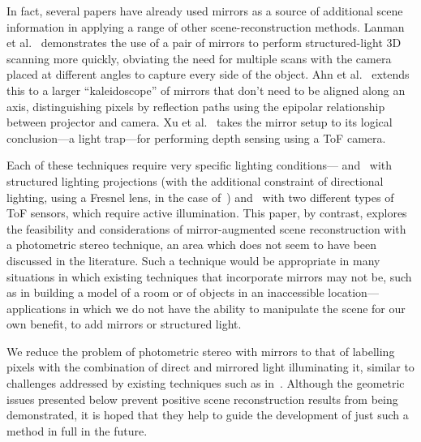 In fact, several papers have already used mirrors as a source of additional
scene information in applying a range of other scene-reconstruction methods.
Lanman et al.~\cite{lanman} demonstrates the use of a pair of mirrors to
perform structured-light 3D scanning more quickly, obviating the need for
multiple scans with the camera placed at different angles to capture every side
of the object. Ahn et al.~\cite{ahn} extends this to a larger ``kaleidoscope''
of mirrors that don't need to be aligned along an axis, distinguishing pixels
by reflection paths using the epipolar relationship between projector and
camera. Xu et al.~\cite{xu} takes the mirror setup to its logical
conclusion---a light trap---for performing depth sensing using a ToF camera.

Each of these techniques require very specific lighting
conditions---\cite{lanman} and~\cite{ahn} with structured lighting projections
(with the additional constraint of directional lighting, using a Fresnel lens,
in the case of~\cite{lanman}) and~\cite{xu} with two different types of ToF
sensors, which require active illumination. This paper, by contrast, explores
the feasibility and considerations of mirror-augmented scene reconstruction
with a photometric stereo technique, an area which does not seem to have been
discussed in the literature. Such a technique would be appropriate in many
situations in which existing techniques that incorporate mirrors may not be,
such as in building a model of a room or of objects in an inaccessible
location---applications in which we do not have the ability to manipulate the
scene for our own benefit, to add mirrors or structured light.

We reduce the problem of photometric stereo with mirrors to that of labelling
pixels with the combination of direct and mirrored light illuminating it,
similar to challenges addressed by existing techniques such as
in~\cite{schechner}. Although the geometric issues presented below prevent
positive scene reconstruction results from being demonstrated, it is hoped that
they help to guide the development of just such a method in full in the future.

